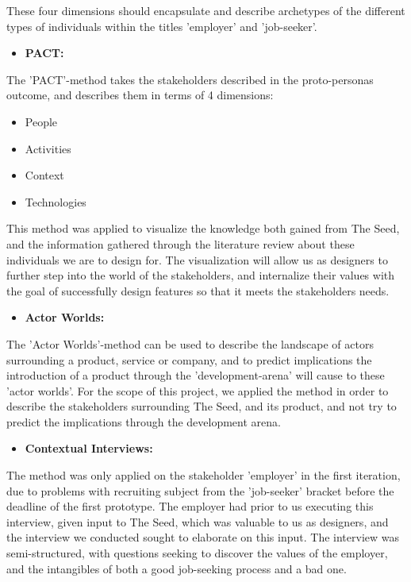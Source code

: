 These four dimensions should encapsulate and describe archetypes of the different types of individuals within the titles 'employer' and 'job-seeker'.

\begin{itemize}
    \item \bf{PACT:}
\end{itemize}

The 'PACT'-method takes the stakeholders described in the proto-personas outcome, and describes them in terms of 4 dimensions:
\begin{itemize}
    \item People
    \item Activities
    \item Context
    \item Technologies
\end{itemize}
This method was applied to visualize the knowledge both gained from The Seed, and the information gathered through the literature review about these individuals we are to design for. The visualization will allow us as designers to further step into the world of the stakeholders, and internalize their values with the goal of successfully design features so that it meets the stakeholders needs.

\begin{itemize}
    \item \bf{Actor Worlds:}
\end{itemize}

The 'Actor Worlds'-method can be used to describe the landscape of actors surrounding a product, service or company, and to predict implications the introduction of a product through the 'development-arena' will cause to these 'actor worlds'. For the scope of this project, we applied the method in order to describe the stakeholders surrounding The Seed, and its product, and not try to predict the implications through the development arena.

\begin{itemize}
    \item \bf{Contextual Interviews:}
\end{itemize}

The method was only applied on the stakeholder 'employer' in the first iteration, due to problems with recruiting subject from the 'job-seeker' bracket before the deadline of the first prototype. The employer had prior to us executing this interview, given input to The Seed, which was valuable to us as designers, and the interview we conducted sought to elaborate on this input. The interview was semi-structured, with questions seeking to discover the values of the employer, and the intangibles of both a good job-seeking process and a bad one.

